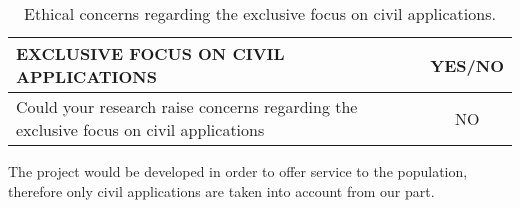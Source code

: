 \begin{table}[H]
	\centering
	\begin{tabular}[H]{ p{12.6cm} c }
		
		\toprule[2pt]
		
		\textbf{EXCLUSIVE FOCUS ON CIVIL APPLICATIONS} & \textbf{YES/NO} \\
		
		\midrule[1.5pt]
		
		Could your research raise concerns regarding the exclusive focus on civil applications\vspace{0.1cm} & NO\\
		
		\bottomrule[2pt]	
			
	\end{tabular}
	\caption[Ethics -Exclusive use on civil applications]{Ethical concerns regarding the exclusive focus on civil applications.}
	\label{Ethics_Civilfocus}
\end{table}

\vspace{-0.5cm}
The project would be developed in order to offer service to the population, therefore only civil applications are taken into account from our part.